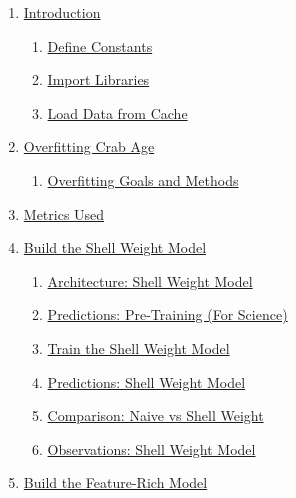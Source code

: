 \documentclass[11pt]{article}
\providecommand{\tightlist}{%
      \setlength{\itemsep}{0pt}\setlength{\parskip}{0pt}}
\begin{document}
\begin{enumerate}
\def\labelenumi{\arabic{enumi}.}
\tightlist
\item
  \hyperref[introduction]{Introduction}

  \begin{enumerate}
  \def\labelenumii{\arabic{enumii}.}
  \tightlist
  \item
    \hyperref[define-constants]{Define Constants}
  \item
    \hyperref[import-libraries]{Import Libraries}
  \item
    \hyperref[load-data-from-cache]{Load Data from Cache}
  \end{enumerate}
\item
  \hyperref[overfitting-crab-age]{Overfitting Crab Age}

  \begin{enumerate}
  \def\labelenumii{\arabic{enumii}.}
  \tightlist
  \item
    \hyperref[overfitting-goals-and-methods]{Overfitting Goals and Methods}
  \end{enumerate}
\item
  \hyperref[metrics-used]{Metrics Used}
\item
  \hyperref[build-the-shell-weight-model]{Build the Shell Weight Model}

  \begin{enumerate}
  \def\labelenumii{\arabic{enumii}.}
  \tightlist
  \item
    \hyperref[architecture-shell-weight-model]{Architecture: Shell Weight Model}
  \item
    \hyperref[predictions-pre-training-for-science]{Predictions: Pre-Training (For Science)}
  \item
    \hyperref[train-the-shell-weight-model]{Train the Shell Weight Model}
  \item
    \hyperref[predictions-shell-weight-model]{Predictions: Shell Weight Model}
  \item
    \hyperref[comparison-naive-vs-shell-weight]{Comparison: Naive vs Shell Weight}
  \item
    \hyperref[observations-shell-weight-model]{Observations: Shell Weight Model}
  \end{enumerate}
\item
  \hyperref[build-the-feature-rich-model]{Build the Feature-Rich Model}


\end{enumerate}
\end{document}
